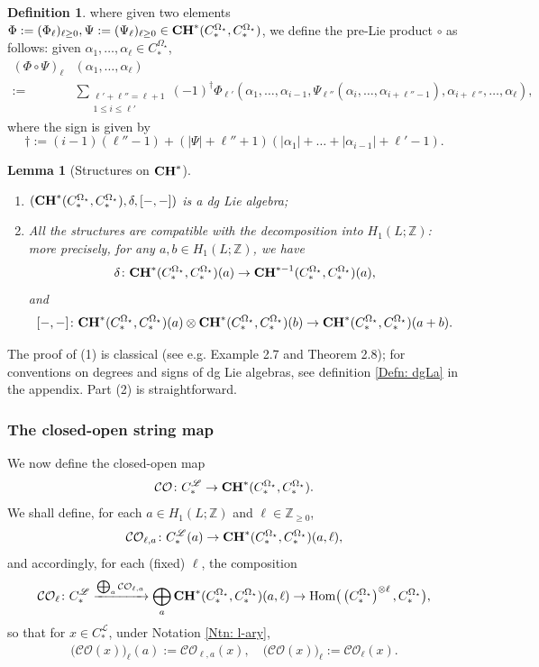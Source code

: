 \documentclass[10pt]{amsart}
\numberwithin{equation}{section}
\theoremstyle{plain}
\newtheorem{lemma}[theorem]{Lemma}
\theoremstyle{definition}
\newtheorem{definition}[theorem]{Definition}
\theoremstyle{remark}
\numberwithin{equation}{section}
\newcommand{\Z}{\mathbb{Z}}
\newcommand{\Hom}{\textup{Hom}}
\newcommand{\CO}{\mathcal{CO}}
\newcommand{\CC}{\textbf{\textup{CH}}}
\newcommand{\CFr}{C_*^\mathscr{L}}
\newcommand{\CBa}{C_*^{\Omega_\star}}
\begin{document}
{\begin{definition}
where given two elements $\Phi:=(\Phi_\ell)_{\ell\geq 0}, \Psi:=(\Psi_\ell)_{\ell\geq 0} \in \CC^*(\CBa,\CBa)$, we define the pre-Lie product $\circ$ as follows: given $\alpha_1,\dots, \alpha_{\ell}\in \CBa$,
\begin{align*}
	(\Phi \circ \Psi)_\ell &(\alpha_1,\dots, \alpha_\ell) \\
	:= & \sum_{\substack{\ell' + \ell''=\ell+1\\ 1 \leq i \leq \ell'}} (-1)^\dagger \Phi_{\ell'}(\alpha_1,\dots, \alpha_{i-1}, \Psi_{\ell''}(\alpha_i,\dots, \alpha_{i+\ell''-1}),\alpha_{i+\ell''},\dots, \alpha_\ell),
\end{align*}
where the sign is given by \[ \dagger:= (i-1)(\ell''-1)+(|\Psi|+\ell''+1)(|\alpha_1|+\dots + |\alpha_{i-1}| + \ell' - 1). \]
\end{definition}


\begin{lemma}
	[Structures on $\CC^*$]\label{Lm: StructuresOnHochschild}
	\begin{enumerate}
		\item $(\CC^*(\CBa,\CBa), \delta, [-,-])$ is a dg Lie algebra;
		\item All the structures are compatible with the decomposition into $H_1(L;\Z)$: more precisely,  for any $a,b\in H_1(L;\Z)$, we  have \[\delta\colon \CC^*(\CBa,\CBa)(a)\to \CC^{*-1}(\CBa,\CBa)(a),\]and \[[-,-]\colon \CC^*(\CBa,\CBa)(a)\otimes \CC^*(\CBa,\CBa)(b) \to \CC^*(\CBa,\CBa)(a+b).\]
	\end{enumerate}
\end{lemma}
The proof of (1) is classical (see e.g. \cite{Irie1} Example 2.7 and Theorem 2.8); for conventions on degrees and signs of dg Lie algebras, see definition \ref{Defn: dgLa} in the appendix. Part (2) is straightforward.


\subsubsection{The closed-open string map}
We now define the closed-open map \[\CO\colon \CFr\to \CC^*(\CBa,\CBa).\]
We shall define, for each $a\in H_1(L;\Z)$ and $\ell \in \Z_{\geq 0}$,
\begin{align*}
	\CO_{\ell,a}\colon \CFr(a)\to \CC^*(\CBa,\CBa)(a,\ell),
\end{align*}
and accordingly, for each (fixed) $\ell$, the composition \[\CO_\ell\colon \CFr\xrightarrow{\bigoplus_a \CO_{\ell,a}} \bigoplus_a \CC^*(\CBa,\CBa)(a,\ell) \to  \Hom\big(\left(\CBa\right)^{\otimes \ell},\CBa\big),\] 
so that for $x\in \CFr$, under Notation \ref{Ntn: l-ary},
\begin{align*}
	\big(\CO(x)\big)_\ell(a):= \CO_{\ell, a}(x), \quad \big(\CO(x)\big)_\ell := \CO_\ell(x).
\end{align*}



}
\end{document}

